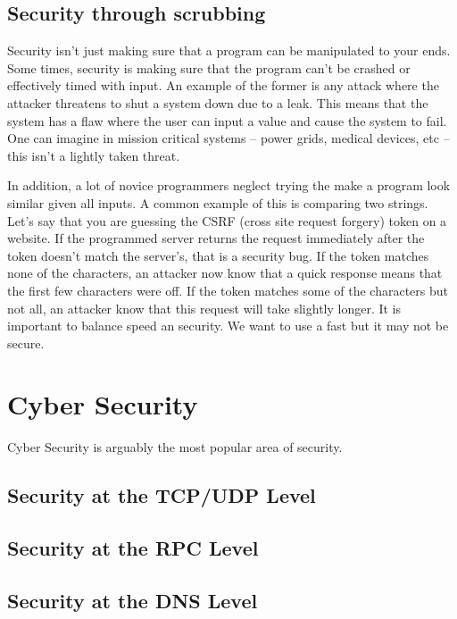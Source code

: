 \subsection{Security through scrubbing}

Security isn't just making sure that a program can be manipulated to your ends.
Some times, security is making sure that the program can't be crashed or effectively timed with input.
An example of the former is any attack where the attacker threatens to shut a system down due to a leak.
This means that the system has a flaw where the user can input a value and cause the system to fail.
One can imagine in mission critical systems -- power grids, medical devices, etc -- this isn't a lightly taken threat.

In addition, a lot of novice programmers neglect trying the make a program look similar given all inputs.
A common example of this is comparing two strings.
Let's say that you are guessing the CSRF (cross site request forgery) token on a website.
If the programmed server returns the request immediately after the token doesn't match the server's, that is a security bug.
If the token matches none of the characters, an attacker now know that a quick response means that the first few characters were off.
If the token matches some of the characters but not all, an attacker know that this request will take slightly longer.
It is important to balance speed an security.
We want to use a fast  but it may not be secure.

\section{Cyber Security}

Cyber Security is arguably the most popular area of security.

\subsection{Security at the TCP/UDP Level}


\subsection{Security at the RPC Level}


\subsection{Security at the DNS Level}

